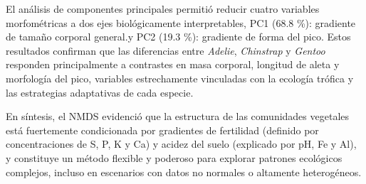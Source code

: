 \documentclass[
  spanish,
  11pt,
  a4paper,
  DIV=11,
  numbers=noendperiod]{scrartcl}
\begin{document}
El análisis de componentes principales permitió reducir cuatro variables
morfométricas a dos ejes biológicamente interpretables, PC1 (68.8 \%):
gradiente de tamaño corporal general.y PC2 (19.3 \%): gradiente de forma
del pico. Estos resultados confirman que las diferencias entre
\emph{Adelie}, \emph{Chinstrap} y \emph{Gentoo} responden principalmente
a contrastes en masa corporal, longitud de aleta y morfología del pico,
variables estrechamente vinculadas con la ecología trófica y las
estrategias adaptativas de cada especie.

En síntesis, el NMDS evidenció que la estructura de las comunidades
vegetales está fuertemente condicionada por gradientes de fertilidad
(definido por concentraciones de S, P, K y Ca) y acidez del suelo
(explicado por pH, Fe y Al), y constituye un método flexible y poderoso
para explorar patrones ecológicos complejos, incluso en escenarios con
datos no normales o altamente heterogéneos.
\end{document}
